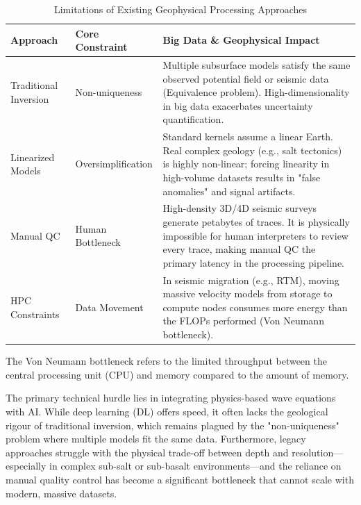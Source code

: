\documentclass[data,article,submit,pdftex,moreauthors]{Definitions/mdpi}
\begin{document}
\begin{table}[ht]
\centering
\begin{threeparttable}
\caption{Limitations of Existing Geophysical Processing Approaches}
\label{tab01}
\begin{tabularx}{\textwidth}{@{} l l X @{}}
\toprule
\textbf{Approach} & \textbf{Core Constraint} & \textbf{Big Data \& Geophysical Impact} \\ \midrule
Traditional Inversion & Non-uniqueness & Multiple subsurface models satisfy the same observed potential field or seismic data (Equivalence problem). High-dimensionality in big data exacerbates uncertainty quantification. \\ \addlinespace
Linearized Models & Oversimplification & Standard kernels assume a linear Earth. Real complex geology (e.g., salt tectonics) is highly non-linear; forcing linearity in high-volume datasets results in "false anomalies" and signal artifacts. \\ \addlinespace
Manual QC & Human Bottleneck & High-density 3D/4D seismic surveys generate petabytes of traces. It is physically impossible for human interpreters to review every trace, making manual QC the primary latency in the processing pipeline. \\ \addlinespace
HPC Constraints & Data Movement & In seismic migration (e.g., RTM), moving massive velocity models from storage to compute nodes consumes more energy than the FLOPs performed (Von Neumann bottleneck\tnote{1}). \\ \bottomrule
\end{tabularx}
\begin{tablenotes}
\small
\item[1] The Von Neumann bottleneck refers to the limited throughput between the central processing unit (CPU) and memory compared to the amount of memory.
\end{tablenotes}
\end{threeparttable}
\end{table}

The primary technical hurdle lies in integrating physics-based wave equations with AI. While deep learning (DL) offers speed, it often lacks the geological rigour of traditional inversion, which remains plagued by the "non-uniqueness" problem where multiple models fit the same data. Furthermore, legacy approaches struggle with the physical trade-off between depth and resolution—especially in complex sub-salt or sub-basalt environments—and the reliance on manual quality control has become a significant bottleneck that cannot scale with modern, massive datasets.
\end{document}
